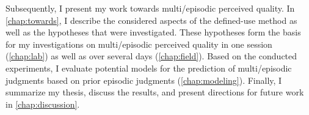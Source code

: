 Subsequently, I present my work towards multi\-/episodic perceived quality. %
In \autoref{chap:towards}, I describe the considered aspects of the defined-use method as well as the hypotheses that were investigated.
These hypotheses form the basis for my investigations on multi\-/episodic perceived quality in one session (\autoref{chap:lab}) as well as over several days (\autoref{chap:field}).
Based on the conducted experiments, I evaluate potential models for the prediction of multi\-/episodic judgments based on prior episodic judgments (\autoref{chap:modeling}).
Finally, I summarize my thesis, discuss the results, and present directions for future work in \autoref{chap:discussion}.